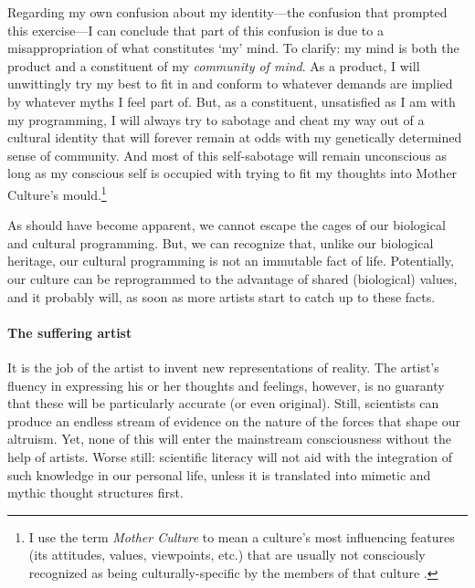 \documentclass{article}
\begin{document}
Regarding my own confusion about my identity---the confusion that prompted this
exercise---I can conclude that part of this confusion is due to a misappropriation
of what constitutes ‘my’ mind. To clarify: my mind is both the product and a
constituent of my \emph{community of mind}. As a product, I will unwittingly
try my best to fit in and conform to whatever demands are implied by whatever
myths I feel part of. But, as a constituent, unsatisfied as I am with my
programming, I will always try to sabotage and cheat my way out of a cultural
identity that will forever remain at odds with my genetically determined
sense of community. And most of this self-sabotage will remain unconscious as
long as my conscious self is occupied with trying to fit my thoughts into
Mother Culture's mould.\footnote{I use the term \emph{Mother Culture} to mean
a culture's most influencing features (its attitudes, values, viewpoints, etc.)
that are usually not consciously recognized as being culturally-specific by the
members of that culture \citep{quinn1992}.} 

As should have become apparent, we cannot escape the cages of our biological
and cultural programming. But, we can recognize that, unlike our biological
heritage, our cultural programming is not an immutable fact of life.
Potentially, our culture can be reprogrammed to the advantage of shared
(biological) values, and it probably will, as soon as more artists start to
catch up to these facts.

\paragraph{The suffering artist}

It is the job of the artist to invent new representations of reality. The artist's
fluency in expressing his or her thoughts and feelings, however, is no guaranty
that these will be particularly accurate (or even original). Still, scientists
can produce an endless stream of evidence on the nature of the forces that
shape our altruism. Yet, none of this will enter the mainstream consciousness
without the help of artists. Worse still: scientific literacy will not aid with
the integration of such knowledge in our personal life, unless it is translated
into mimetic and mythic thought structures first.
\end{document}
